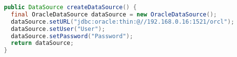 
\begin{lstlisting}[language=Java, caption={Example of creating DataSource for connecting to Oracle database}, label={code:datasource}]
public DataSource createDataSource() {
  final OracleDataSource dataSource = new OracleDataSource();
  dataSource.setURL("jdbc:oracle:thin:@//192.168.0.16:1521/orcl");
  dataSource.setUser("User");
  dataSource.setPassword("Password");
  return dataSource;
}
\end{lstlisting}


